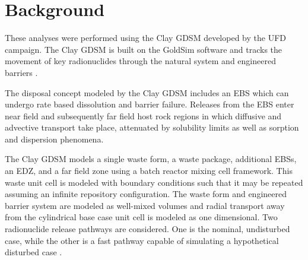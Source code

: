 \section{Background}
These analyses were performed using the Clay \gls{GDSM} developed by the 
\gls{UFD} campaign\cite{clayton_generic_2011}. The Clay \gls{GDSM} is built on 
the 
GoldSim software and tracks the movement of key radionuclides through the 
natural system and engineered barriers \cite{golder_goldsim_2010, 
golder_goldsim_ct_2010}.

The disposal concept modeled by the Clay \gls{GDSM} includes an \gls{EBS} which 
can undergo rate based dissolution and barrier failure. Releases from the 
\gls{EBS} enter 
near field and subsequently far field host rock regions in which diffusive and 
advective transport take place, attenuated by solubility limits as well as 
sorption and dispersion phenomena.  

The Clay \gls{GDSM} models a single waste form, a waste package, additional 
\glspl{EBS}, 
an \gls{EDZ}, and a far field zone using a batch reactor mixing cell framework. 
This waste unit cell is modeled 
with boundary conditions such that it may be repeated assuming an infinite 
repository configuration. The waste form and engineered barrier system are 
modeled as well-mixed volumes 
and radial transport away from the cylindrical base case unit cell is modeled as  
one dimensional. Two radionuclide release pathways are considered. One is the 
nominal, 
undisturbed case, while the other is a fast pathway capable of simulating a 
hypothetical disturbed case 
\cite{clayton_generic_2011}.
